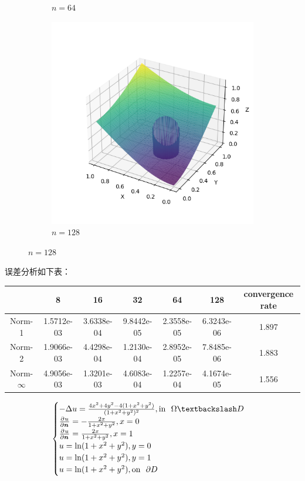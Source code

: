 \documentclass[lang=cn,a4paper,newtx,bibend=bibtex]{elegantpaper}
\begin{document}
\begin{figure}[H]
\begin{subfigure}[b]{0.18\textwidth}
      \caption{$n = 64$}
  \end{subfigure}
  \hfill
  \begin{subfigure}[b]{0.18\textwidth}
      \includegraphics[width=\textwidth]{../../res_bac/res-[data|3-Neumann-irregular-e128].png}
      \caption{$n = 128$}
  \end{subfigure}
\end{figure}

误差分析如下表：

\begin{table}[H]
  \centering
  \begin{tabular}{|c|c|c|c|c|c|c|}
  \hline
   & 8 & 16 & 32 & 64 & 128 & convergence rate \\
  \hline
  Norm-1 & 1.5712e-03 & 3.6338e-04 & 9.8442e-05 & 2.3558e-05 & 6.3243e-06 & 1.897 \\
  Norm-2 & 1.9066e-03 & 4.4298e-04 & 1.2130e-04 & 2.8952e-05 & 7.8485e-06 & 1.883 \\
  Norm-$\infty$ & 4.9056e-03 & 1.3201e-03 & 4.6083e-04 & 1.2257e-04 & 4.1674e-05 & 1.556 \\
  \hline
  \end{tabular}
  \end{table}


\[
\begin{cases}
  - \Delta u = \frac{4x^2 + 4y^2 - 4(1 + x^2 + y^2)}{(1 + x^2 + y^2)^2}, \text{in~~} \Omega \fxg D \\
  \apart{u}{\bm{n}}{} = -\frac{2x}{1+x^2+y^2}, x = 0 \\
  \apart{u}{\bm{n}}{} = \frac{2x}{1+x^2+y^2}, x = 1 \\  
  u = \ln (1 + x^2 + y^2), y = 0 \\
  u = \ln (1 + x^2 + y^2), y = 1 \\  
  u = \ln (1 + x^2 + y^2), \text{on~~} \partial D
\end{cases}
\]
\end{document}
